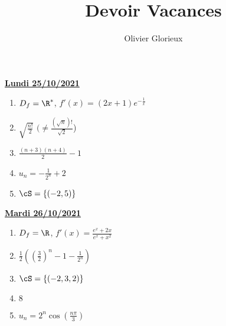 \documentclass[a4paper, 11pt,reqno]{article}
\author{Olivier Glorieux}
\newcommand{\jour}[1]{
\begin{center}
\underline{\textbf{#1}}
\end{center}

 }
\begin{document}
\title{Devoir Vacances
}

\begin{center}
\underline{\textbf{Lundi 25/10/2021}}
\end{center}

\begin{correction}
\begin{enumerate}
\item $D_f= \R^*$, $f'(x) = (2x +1) e^{-\frac{1}{x}}$
\item $\sqrt{\frac{n!}{2}}$ $(\neq \frac{(\sqrt{n})!}{\sqrt{2}}$)
\item $\frac{(n+3)(n+4)}{2} - 1$
\item $u_n= -\frac{1}{2^n} +2$
\item $\cS=\{ (-2,5)\}$
\end{enumerate}
\end{correction} 







\jour{Mardi 26/10/2021}
\begin{correction}
\begin{enumerate}
\item $D_f= \R$, $f'(x) =\frac{e^x+2x}{e^x+x^2}$
\item $\frac{1}{2} \left(  \left(\frac{3}{2}\right)^n -1- \frac{1}{2^n}\right)$
\item $\cS= \{ (-2, 3,2)\}$
\item $8$
\item $u_n = 2^n\cos\left(\frac{n\pi}{3}\right)$
\end{enumerate}
\end{correction} 
\end{document}
